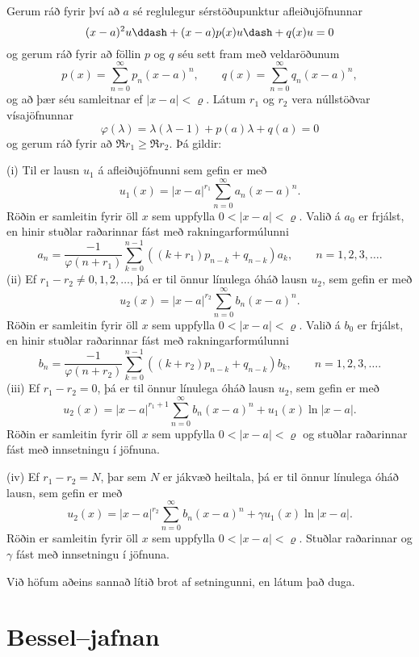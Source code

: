 \begin{se}  
Gerum ráð fyrir því að $a$ sé reglulegur sérstöðupunktur
afleiðujöfnunnar 
 \begin{equation*}(x-a)^2u\ddash+ (x-a)p(x)u\dash+q(x)u=0
\label{3.4.8}
 \end{equation*}
og gerum ráð fyrir að föllin $p$ og $q$ séu sett fram með
veldaröðunum 
 \begin{equation*}p(x)=\sum_{n=0}^\infty p_n(x-a)^n, \qquad
q(x)=\sum_{n=0}^\infty q_n(x-a)^n,
\label{3.4.9}
 \end{equation*}
og að þær séu samleitnar ef $|x-a|<\varrho$.  Látum $r_1$ og $r_2$
vera núllstöðvar vísajöfnunnar
 $$\varphi(\lambda)=\lambda(\lambda-1)+p(a)\lambda+q(a)=0
 $$
og gerum ráð fyrir að $\Re r_1\geq \Re r_2$.  Þá gildir:

(i) Til er lausn $u_1$ á afleiðujöfnunni  sem gefin er með 
 $$u_1(x)=|x-a|^{r_1}\sum_{n=0}^\infty a_n(x-a)^n.
 $$
Röðin er samleitin fyrir öll $x$ sem uppfylla $0<|x-a|<\varrho$.
Valið á $a_0$ er frjálst, en hinir 
stuðlar raðarinnar  fást með rakningarformúlunni
 $$
a_n=\dfrac{-1}{\varphi(n+r_1)}
\sum_{k=0}^{n-1}((k+r_1)p_{n-k}+q_{n-k})a_k, \qquad n=1,2,3,\dots.
 $$
(ii) Ef $r_1-r_2\neq 0,1,2,\dots$, þá er til önnur línulega óháð 
lausn $u_2$,  sem gefin er með 
 $$u_2(x)=|x-a|^{r_2}\sum_{n=0}^\infty b_n(x-a)^n.
 $$
Röðin er samleitin fyrir öll $x$ sem uppfylla $0<|x-a|<\varrho$.
Valið á $b_0$ er frjálst, en hinir
stuðlar raðarinnar fást með rakningarformúlunni
 $$
b_n=\dfrac{-1}{\varphi(n+r_2)}
\sum_{k=0}^{n-1}((k+r_2)p_{n-k}+q_{n-k})b_k, \qquad n=1,2,3,\dots.
 $$
(iii) Ef $r_1-r_2=0$, þá er til önnur línulega óháð lausn $u_2$,
sem gefin er með 
 $$u_2(x)=|x-a|^{r_1+1}\sum_{n=0}^\infty b_n(x-a)^n+
u_1(x)\ln|x-a|.
 $$
Röðin er samleitin fyrir öll $x$ sem uppfylla $0<|x-a|<\varrho$ og
stuðlar raðarinnar  fást með innsetningu í jöfnuna.

\smallskip\noindent
(iv) Ef $r_1-r_2=N$, þar sem $N$ er jákvæð heiltala, þá er til önnur
línulega óháð lausn, sem gefin er með 
 $$u_2(x)=|x-a|^{r_2}\sum_{n=0}^\infty b_n(x-a)^n+
\gamma u_1(x)\ln|x-a|.
 $$
Röðin er samleitin fyrir öll $x$ sem uppfylla $0<|x-a|<\varrho$.
Stuðlar raðarinnar og $\gamma$  fást með innsetningu í jöfnuna.
\end{se}

Við höfum aðeins sannað lítið brot af setningunni, en látum það duga.


\section{Bessel--jafnan}


